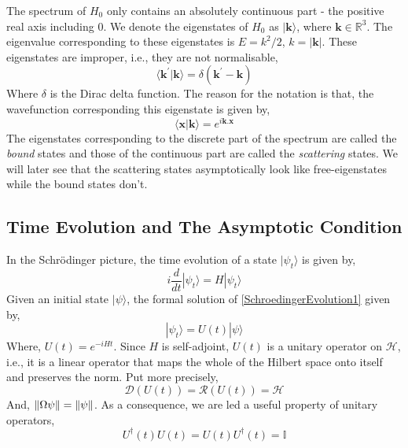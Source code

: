 \documentclass[a4paper,10pt]{report}
\begin{document}
The spectrum of $H_0$ only contains an absolutely continuous part - the positive real axis including $0$. We denote the eigenstates of
$H_0$ as $|\mathbf{k}\rangle$, where $\mathbf{k}\in\mathbb{R}^3$. The eigenvalue corresponding to these eigenstates is $E=k^2/2$,
$k=|\mathbf{k}|$. These eigenstates are improper, i.e., they are not normalisable,
\begin{equation}\label{FreeNormalisation}
 \langle\mathbf{k}^{\prime}|\mathbf{k}\rangle=\delta\left(\mathbf{k}^{\prime}-\mathbf{k}\right)
\end{equation}
Where $\delta$ is the Dirac delta function. The reason for the notation is that, the wavefunction corresponding this eigenstate is given by,
\begin{equation}\label{FreeWavefunction}
  \langle\mathbf{x}|\mathbf{k}\rangle = e^{i\mathbf{k}.\mathbf{x}}
\end{equation}
The eigenstates corresponding to the discrete part of the spectrum are called the \emph{bound} states and those of the continuous
part are called the \emph{scattering} states. We will later see that the scattering states asymptotically look like free-eigenstates while
the bound states don't.
\vspace{\baselineskip}

\subsection{Time Evolution and The Asymptotic Condition}
 In the Schrödinger picture, the time evolution of a state $|\psi_t\rangle$ is given by,
\begin{equation}\label{SchroedingerEvolution1}
 i\frac{d}{dt}|\psi_t\rangle = H|\psi_t\rangle
\end{equation}
Given an initial state $|\psi\rangle$, the formal solution of \eqref{SchroedingerEvolution1}
given by,
\begin{equation}\label{TimeEvolution}
 |\psi_t\rangle = U(t)|\psi\rangle 
\end{equation}
Where, $U(t)=e^{-iHt}$. Since $H$ is self-adjoint, $U(t)$ is a unitary operator on $\mathcal{H}$, i.e., it is a linear operator that
maps the whole of the Hilbert space onto itself and preserves the norm. Put more precisely, 
\begin{equation*}
\mathcal{D}\left(U(t)\right)=\mathcal{R}\left(U(t)\right)=\mathcal{H}
\end{equation*}
And, $\Arrowvert\Omega\psi\Arrowvert=\Arrowvert\psi\Arrowvert$. As a consequence, we are led a useful property of unitary operators, 
\begin{equation}\label{unitaryprop}
  U^\dagger(t)U(t)=U(t)U^\dagger(t)=\mathbb{I}
\end{equation}
\end{document}
